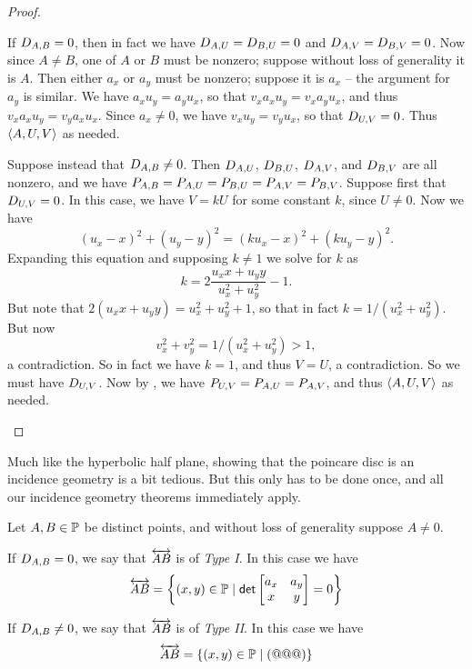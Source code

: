 \begin{proof}
\begin{itemize}
If \(D_{A,B} = 0\), then in fact we have \(D_{A,U} = D_{B,U} = 0\) and \(D_{A,V} = D_{B,V} = 0\).
Now since \(A \neq B\), one of \(A\) or \(B\) must be nonzero; suppose without loss of generality it is \(A\).
Then either \(a_x\) or \(a_y\) must be nonzero; suppose it is \(a_x\) -- the argument for \(a_y\) is similar.
We have \(a_xu_y = a_yu_x\), so that \(v_xa_xu_y = v_xa_yu_x\), and thus \(v_xa_xu_y = v_ya_xu_x\).
Since \(a_x \neq 0\), we have \(v_xu_y = v_yu_x\), so that \(D_{U,V} = 0\).
Thus \(\langle A, U, V \rangle\) as needed.

Suppose instead that \(D_{A,B} \neq 0\).
Then \(D_{A,U}\), \(D_{B,U}\), \(D_{A,V}\), and \(D_{B,V}\) are all nonzero, and we have \(P_{A,B} = P_{A,U} = P_{B,U} = P_{A,V} = P_{B,V}\).
Suppose first that \(D_{U,V} = 0\).
In this case, we have \(V = kU\) for some constant \(k\), since \(U \neq 0\).
Now we have \[ (u_x - x)^2 + (u_y - y)^2 = (ku_x - x)^2 + (ku_y - y)^2. \]
Expanding this equation and supposing \(k \neq 1\) we solve for \(k\) as \[ k = 2\frac{u_xx + u_yy}{u_x^2 + u_y^2} - 1. \]
But note that \(2(u_xx + u_yy) = u_x^2 + u_y^2 + 1\), so that in fact \(k = 1/(u_x^2 + u_y^2)\).
But now \[v_x^2 + v_y^2 = 1/(u_x^2 + u_y^2) > 1,\] a contradiction.
So in fact we have \(k = 1\), and thus \(V = U\), a contradiction.
So we must have \(D_{U,V}\).
Now by , we have \(P_{U,V} = P_{A,U} = P_{A,V}\), and thus \(\langle A, U, V \rangle\) as needed.
\qedhere
\end{itemize}
\end{proof}

Much like the hyperbolic half plane, showing that the poincare disc is an incidence geometry is a bit tedious.
But this only has to be done once, and all our incidence geometry theorems immediately apply.

\begin{prop}
Let \(A,B \in \mathbb{P}\) be distinct points, and without loss of generality suppose \(A \neq 0\).
\begin{proplist}
\item If \(D_{A,B} = 0\), we say that \(\overleftrightarrow{AB}\) is of \emph{Type I}.
In this case we have \[ \overleftrightarrow{AB} = \left\{ (x,y) \in \mathbb{P} \mid \mathsf{det} \begin{bmatrix} a_x & a_y \\ x & y \end{bmatrix} = 0 \right\} \]
\item If \(D_{A,B} \neq 0\), we say that \(\overleftrightarrow{AB}\) is of \emph{Type II}.
In this case we have \[ \overleftrightarrow{AB} = \left\{ (x,y) \in \mathbb{P} \mid (@@@) \right\} \]
\end{proplist}
\end{prop}
